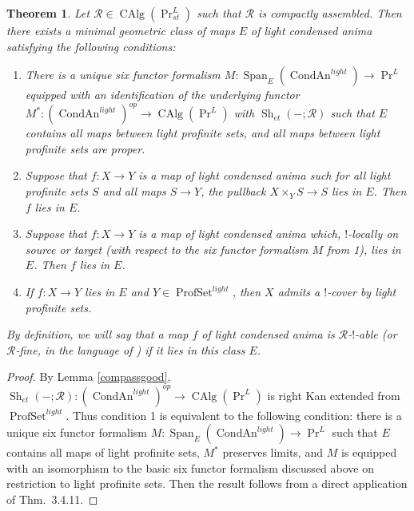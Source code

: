 \documentclass[12pt]{article}
\newtheorem{theorem}{Theorem}[section]
\newcommand{\on}{\operatorname}
\begin{document}
\begin{theorem}\label{sixfunctorextension}
Let $\mathcal{R}\in\on{CAlg}(\on{Pr}_{st}^L)$ such that $\mathcal{R}$ is compactly assembled.  Then there exists a minimal geometric class of maps $E$ of light condensed anima satisfying the following conditions:
\begin{enumerate}
\item There is a unique six functor formalism $M:\on{Span}_E(\on{CondAn}^{light})\to \on{Pr}^L$ equipped with an identification of the underlying functor $M^\ast:(\on{CondAn}^{light})^{op}\to \on{CAlg}(\on{Pr}^L)$ with $\on{Sh}_{et}(-;\mathcal{R})$ such that $E$ contains all maps between light profinite sets, and all maps between light profinite sets are \emph{proper}.
\item Suppose that $f:X\to Y$ is a map of light condensed anima such for all light profinite sets $S$ and all maps $S\to Y$, the pullback $X\times_Y S \to S$ lies in $E$.  Then $f$ lies in $E$.
\item Suppose that $f:X\to Y$ is a map of light condensed anima which, $!$-locally on source or target (with respect to the six functor formalism $M$ from 1), lies in $E$.  Then $f$ lies in $E$.
\item If $f:X\to Y$ lies in $E$ and $Y\in\on{ProfSet}^{light}$, then $X$ admits a $!$-cover by light profinite sets.
\end{enumerate}
By definition, we will say that a map $f$ of light condensed anima is \emph{$\mathcal{R}$-$!$-able} (or \emph{$\mathcal{R}$-fine}, in the language of \cite{HeyerSixFunctors}) if it lies in this class $E$.
\end{theorem}
\begin{proof}
By Lemma \ref{compassgood}, $\on{Sh}_{et}(-;\mathcal{R}):(\on{CondAn}^{light})^{op}\to\on{CAlg}(\on{Pr}^L)$ is right Kan extended from $\on{ProfSet}^{light}$.  Thus condition 1 is equivalent to the following condition: there is a unique six functor formalism $M:\on{Span}_E(\on{CondAn}^{light})\to \on{Pr}^L$ such that $E$ contains all maps of light profinite sets, $M^\ast$ preserves limits, and $M$ is equipped with an isomorphism to the basic six functor formalism discussed above on restriction to light profinite sets.  Then the result follows from a direct application of \cite{HeyerSixFunctors} Thm.\ 3.4.11.
\end{proof}
\end{document}
